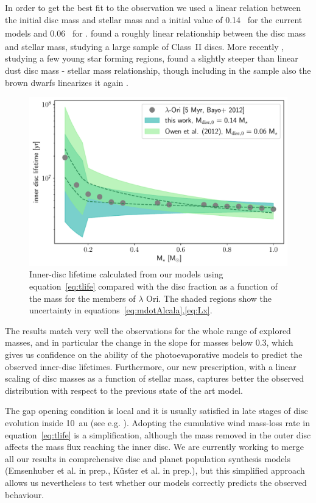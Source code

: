 \documentclass[usenatbib,useAMS,usedcolumn]{mnras}
\begin{document}
In order to get the best fit to the observation we used a linear relation between the initial disc mass and stellar mass and a initial value of \SI{0.14}{_\star} for the current models and \SI{0.06}{_\star} for .
 found a roughly linear relationship between the disc mass and stellar mass, studying a large sample of Class~II discs. More recently , studying a few young star forming regions, found a slightly steeper than linear dust disc mass - stellar mass relationship, though including in the sample also the brown dwarfs linearizes it again .
\begin{figure}
    \centering
    \includegraphics[width=\columnwidth]{Figure11}
    \caption{Inner-disc lifetime calculated from our models using equation~\ref{eq:tlife} compared with the disc fraction as a function of the mass for the members of $\lambda$ Ori. The shaded regions show the uncertainty in equations~\ref{eq:mdotAlcala},\ref{eq:Lx}. \label{fig:obs}}
\end{figure}
The results match very well the observations for the whole range of explored masses, and in particular the change in the slope for masses below \SI{0.3}{\solarmass}, which gives us confidence on the ability of the photoevaporative models to predict the observed inner-disc lifetimes. Furthermore, our new prescription, with a linear scaling of disc masses as a function of stellar mass, captures better the observed distribution with respect to the previous state of the art model.

The gap opening condition is local and it is usually satisfied in late stages of disc evolution inside \SI{10}{\astronomicalunit} (see e.g. ). Adopting the cumulative wind mass-loss rate in equation~\ref{eq:tlife} is a simplification, although the mass removed in the outer disc affects the mass flux reaching the inner disc. We are currently working to merge all our results in comprehensive disc and planet population synthesis models (Emsenhuber et al. in prep., K{\"u}ster et al. in prep.), but this simplified approach allows us nevertheless to test whether our models correctly predicts the observed behaviour.
\end{document}
